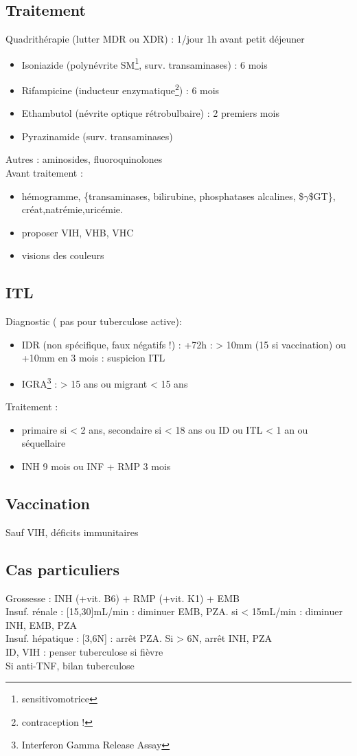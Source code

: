 \documentclass{article}
\newcommand*{\TakeFourierOrnament}[1]{{%
\fontencoding{U}\fontfamily{futs}\selectfont\char#1}}
\newcommand*{\danger}{\TakeFourierOrnament{66}}
\begin{document}
\subsection{Traitement}
Quadrithérapie (lutter MDR ou XDR) : 1/jour 1h avant petit déjeuner
\begin{itemize}
\item Isoniazide (polynévrite SM\footnote{sensitivomotrice}, surv. transaminases) : 6 mois
\item Rifampicine (inducteur enzymatique\footnote{contraception !}) : 6 mois
\item Ethambutol (névrite optique rétrobulbaire) : 2 premiers mois
\item Pyrazinamide (surv. transaminases)
\end{itemize}
Autres : aminosides, fluoroquinolones \\
Avant traitement : 
\begin{itemize}
\item hémogramme, \{transaminases, bilirubine, phosphatases alcalines, \$\(\gamma\)\$GT\}, créat,natrémie,uricémie.
\item proposer VIH, VHB, VHC
\item visions des couleurs
\end{itemize}

\subsection{ITL}
Diagnostic (\danger pas pour tuberculose active): 
\begin{itemize}
\item IDR (non spécifique, faux négatifs !) : +72h : \diameter > 10mm (15 si vaccination) ou +10mm en 3 mois : suspicion ITL
\item IGRA\footnote{Interferon Gamma Release Assay} : > 15 ans ou migrant  < 15 ans
\end{itemize}
Traitement : 
\begin{itemize}
\item primaire si < 2 ans, secondaire si < 18 ans ou ID ou ITL < 1 an ou séquellaire
\item INH 9 mois ou INF + RMP 3 mois
\end{itemize}
\subsection{Vaccination}
Sauf VIH, déficits immunitaires
\subsection{Cas particuliers}
Grossesse : INH (+vit. B6) + RMP (+vit. K1) + EMB\\
Insuf. rénale : [15,30]mL/min : diminuer EMB, PZA. si < 15mL/min : diminuer INH, EMB, PZA\\
Insuf. hépatique : [3,6N] : arrêt PZA. Si > 6N, arrêt INH, PZA\\
ID, VIH : penser tuberculose si fièvre\\
Si anti-TNF, bilan tuberculose
\end{document}
